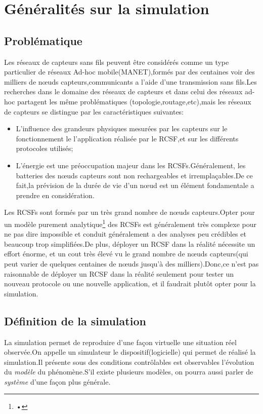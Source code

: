 
\chapter{Généralités sur la simulation}
\section{Problématique}
Les réseaux de capteurs sans fils peuvent être considérés comme un type particulier de réseaux Ad-hoc mobile(MANET),formés par des  centaines voir des milliers de nœuds capteurs,communicants a l'aide d'une transmission sans fils.Les recherches dans le domaine des réseaux de capteurs et dans celui des réseaux ad-hoc partagent les même problématiques (topologie,routage,etc),mais les réseaux de capteurs se distingue par les caractéristiques suivantes:
\begin{itemize}
\item L'influence des grandeurs physiques mesurées par les capteurs sur le fonctionnement le l'application réalisée par le RCSF,et sur les différents protocoles utilisés; 
\item L'énergie est une préoccupation majeur dans les RCSFs.Généralement, les batteries des nœuds capteurs sont non rechargeables et irremplaçables.De ce fait,la prévision de la durée de vie d'un nœud est un élément fondamentale a prendre en considération.
\end{itemize}

Les RCSFs sont formés par un très grand nombre de nœuds capteurs.Opter pour un modèle
 purement analytique\footnote{•} des RCSFs est généralement très complexe pour ne pas dire impossible et conduit généralement a des analyses peu crédibles et beaucoup trop simplifiées.De plus, déployer un RCSF dans la réalité nécessite un effort énorme, et un cout très élevé vu le grand nombre de nœuds capteurs(qui peut varier de quelques centaines de nœuds jusqu'à des milliers).Donc,ce n'est pas raisonnable de déployer un RCSF dans la réalité seulement pour tester un nouveau protocole ou une nouvelle application, et il faudrait plutôt opter pour la simulation.   
 
\section{Définition de la simulation }
La simulation permet de reproduire d'une façon virtuelle une situation réel observée.On appelle un simulateur le dispositif(logicielle) qui permet de réalisé la simulation.Il présente sous des conditions contrôlables est observables l'évolution du \emph{modèle} du phénomène.S'il existe plusieurs modèles, on pourra aussi parler de \emph{système} d'une façon plus générale.

